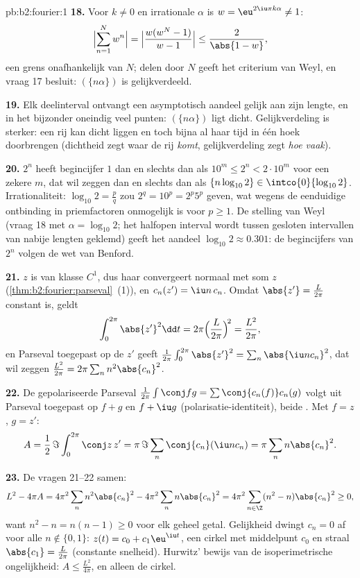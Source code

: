 \begin{solution}{pb:b2:fourier:1}
\textbf{18.} Voor $k \neq 0$ en irrationale $\alpha$ is $w =
\eu^{2\iu\pi k\alpha} \neq 1$:
\[
\Bigl|\sum_{n=1}^{N}w^n\Bigr|
= \Bigl|\frac{w(w^N - 1)}{w - 1}\Bigr|
\leq \frac{2}{\abs{1 - w}} ,
\]
een grens onafhankelijk van $N$; delen door $N$ geeft het criterium
van Weyl, en vraag 17 besluit: $(\{n\alpha\})$ is gelijkverdeeld.

\textbf{19.} Elk deelinterval ontvangt een asymptotisch aandeel
gelijk aan zijn lengte, en in het bijzonder oneindig veel punten:
$(\{n\alpha\})$ ligt dicht. Gelijkverdeling is sterker: een rij
kan dicht liggen en toch bijna al haar tijd in één hoek
doorbrengen (dichtheid zegt waar de rij \emph{komt},
gelijkverdeling zegt \emph{hoe vaak}).

\textbf{20.} $2^n$ heeft begincijfer $1$ dan en slechts dan als
$10^m \leq 2^n < 2\cdot10^m$ voor een zekere $m$, dat wil zeggen
dan en slechts dan als $\{n\log_{10}2\} \in
\intco{0}{\log_{10}2}$. Irrationaliteit: $\log_{10}2 = \frac pq$
zou $2^q = 10^p = 2^p5^p$ geven, wat wegens de eenduidige
ontbinding in priemfactoren onmogelijk is voor $p \geq 1$. De
stelling van Weyl (vraag 18 met $\alpha = \log_{10}2$; het
halfopen interval wordt tussen gesloten intervallen van nabije
lengten geklemd) geeft het aandeel $\log_{10}2 \approx 0.301$: de
begincijfers van $2^n$ volgen de wet van Benford.

\textbf{21.} $z$ is van klasse $C^1$, dus haar 
convergeert normaal met som $z$
(\cref{thm:b2:fourier:parseval}~(1)), en $c_n(z') = \iu n\,c_n$.
Omdat $\abs{z'} = \frac{L}{2\pi}$ constant is, geldt
\[
\int_0^{2\pi}\abs{z'}^2\dd t
= 2\pi\Bigl(\frac{L}{2\pi}\Bigr)^{\!2}
= \frac{L^2}{2\pi} ,
\]
en Parseval toegepast op de  $z'$ geeft
$\frac{1}{2\pi}\int_0^{2\pi}\abs{z'}^2 = \sum_n\abs{\iu nc_n}^2$,
dat wil zeggen $\frac{L^2}{2\pi} = 2\pi\sum_n n^2\abs{c_n}^2$.

\textbf{22.} De gepolariseerde Parseval $\frac{1}{2\pi}\int\conj
fg = \sum\conj{c_n(f)}c_n(g)$ volgt uit Parseval toegepast op $f +
g$ en $f + \iu g$ (polarisatie-identiteit), beide . Met $f =
z$, $g = z'$:
\[
A = \frac12\,\Im\int_0^{2\pi}\conj z\,z'
= \pi\,\Im\sum_n\conj{c_n}(\iu n c_n)
= \pi\sum_n n\abs{c_n}^2 .
\]

\textbf{23.} De vragen 21--22 samen:
\[
L^2 - 4\pi A
= 4\pi^2\sum_n n^2\abs{c_n}^2 -
4\pi^2\sum_n n\abs{c_n}^2
= 4\pi^2\sum_{n\in\Z}(n^2 - n)\abs{c_n}^2 \geq 0 ,
\]
want $n^2 - n = n(n-1) \geq 0$ voor elk geheel getal. Gelijkheid
dwingt $c_n = 0$ af voor alle $n \notin \{0, 1\}$: $z(t) = c_0 +
c_1\eu^{\iu t}$, een cirkel met middelpunt $c_0$ en straal
$\abs{c_1} = \frac{L}{2\pi}$ (constante snelheid). Hurwitz' bewijs
van de isoperimetrische ongelijkheid: $A \leq \frac{L^2}{4\pi}$,
en alleen de cirkel.


\end{solution}
